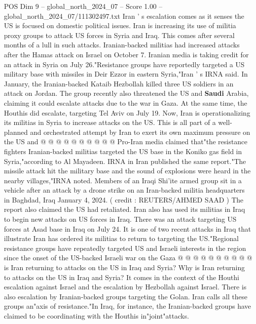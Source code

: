 \begin{textsample}{POS Dim 9 – global\_north\_2024\_07 – Score 1.00 – global\_north\_2024\_07/111302497.txt}  \label{ex:f9_pos_293}
Iran ' s escalation comes as it senses the US is focused on domestic political issues.
Iran is increasing its use of militia proxy groups to attack US forces in Syria and Iraq.
This comes after several months of a lull in such attacks.
Iranian-backed militias had increased attacks after the Hamas attack on Israel on October 7.
Iranian media is taking credit for an attack in Syria on July 26."Resistance groups have reportedly targeted a US military base with missiles in Deir Ezzor in eastern Syria,"Iran ' s IRNA said.
In January, the Iranian-backed Kataib Hezbollah killed three US soldiers in an attack on Jordan.
The group recently also threatened the US and \textbf{Saudi} Arabia, claiming it could escalate attacks due to the war in Gaza.
At the same time, the Houthis did escalate, targeting Tel Aviv on July 19.
Now, Iran is operationalizing its militias in Syria to increase attacks on the US.
This is all part of a well-planned and orchestrated attempt by Iran to exert its own maximum pressure on the US and @ @ @ @ @ @ @ @ @ @ Pro-Iran media claimed that"the resistance fighters Iranian-backed militias targeted the US base in the Koniko gas field in Syria,"according to Al Mayadeen.
IRNA in Iran published the same report."The missile attack hit the military base and the sound of explosions were heard in the nearby villages,"IRNA noted.
Members of an Iraqi Shi'ite armed group sit in a vehicle after an attack by a drone strike on an Iran-backed militia headquarters in Baghdad, Iraq January 4, 2024. ( credit : REUTERS/AHMED SAAD ) The report also claimed the US had retaliated.
Iran also has used its militias in Iraq to begin new attacks on US forces in Iraq.
There was an attack targeting US forces at Asad base in Iraq on July 24.
It is one of two recent attacks in Iraq that illustrate Iran has ordered its militias to return to targeting the US."Regional resistance groups have repeatedly targeted US and Israeli interests in the region since the onset of the US-backed Israeli war on the Gaza @ @ @ @ @ @ @ @ @ @ is Iran returning to attacks on the US in Iraq and Syria?
Why is Iran returning to attacks on the US in Iraq and Syria?
It comes in the context of the Houthi escalation against Israel and the escalation by Hezbollah against Israel.
There is also escalation by Iranian-backed groups targeting the Golan.
Iran calls all these groups an"axis of resistance."In Iraq, for instance, the Iranian-backed groups have claimed to be coordinating with the Houthis in"joint"attacks.

\end{textsample}
